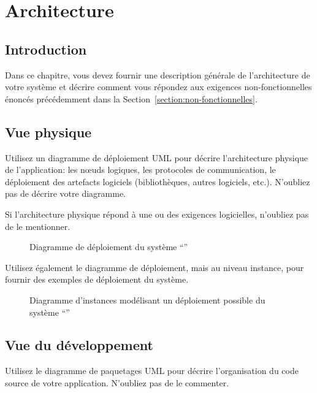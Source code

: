 
\chapter{Architecture}

\section{Introduction}
	Dans ce chapitre, vous devez fournir une description générale de l'architecture de votre système et décrire comment vous répondez aux exigences non-fonctionnelles énoncés précédemment dans la Section~\ref{section:non-fonctionnelles}.


\section{Vue physique}

Utilisez un diagramme de déploiement UML pour décrire l'architecture physique de l'application: les nœuds logiques, les protocoles de communication, le déploiement des artefacts logiciels (bibliothèques, autres logiciels, etc.).
N'oubliez pas de décrire votre diagramme.

Si l'architecture physique répond à une ou des exigences logicielles, n'oubliez pas de le mentionner.

\begin{figure}[!htbp]
\begin{center}

\caption{Diagramme de déploiement du système ``\projet{}''}

\end{center}
\end{figure} 

Utilisez également le diagramme de déploiement, mais au niveau instance, pour fournir des exemples de déploiement du système.

\begin{figure}[!htbp]
\begin{center}

\caption{Diagramme d'instances modélisant un déploiement possible du système ``\projet{}''}
\end{center}
\end{figure} 


\section{Vue du développement}
Utilisez le diagramme de paquetages UML pour décrire l'organisation du code source de votre application.
N'oubliez pas de le commenter.

